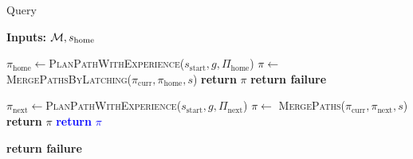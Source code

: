\documentclass[conference]{IEEEtran}
\begin{document}
\begin{algorithm}[t]
\caption{Query}\label{alg:query}  
    \AlgFontSize
\hspace*{\algorithmicindent} \textbf{Inputs:} $\mathcal{M}, s_{\textrm{home}}$
\begin{algorithmic}[1]
 
            \State $\pi_{\textrm{home}} \leftarrow$\textsc{PlanPathWithExperience}($s_{\textrm{start}},g,\Pi_{\textrm{home}}$)
            \State $\pi \leftarrow$ \textsc{MergePathsByLatching}($\pi_{\textrm{curr}},\pi_{\textrm{home}}, s$)
            \State \textbf{return} $\pi$
            \label{alg:query:line:c3b}
        \EndIf
    \EndIf
\State \textbf{return failure}
\EndProcedure
\vspace{2mm}
     
        \label{alg:query:line:c2a}
         
     
        \State $\pi_{\textrm{next}} \leftarrow$\textsc{PlanPathWithExperience}($s_{\textrm{start}},g,\Pi_{\textrm{next}}$)
        \State $\pi \leftarrow$ \textsc{MergePaths}($\pi_{\textrm{curr}},\pi_{\textrm{next}},s$)
        \State \textbf{return} $\pi$
        \label{alg:query:line:c2b}
    \EndIf
%
%
    \textcolor{blue}{
        \State \textbf{return} $\pi$
    \EndIf
    }

\EndFor
    \State \textbf{return failure} 
\EndProcedure
\end{algorithmic}
\end{algorithm}
\end{document}
